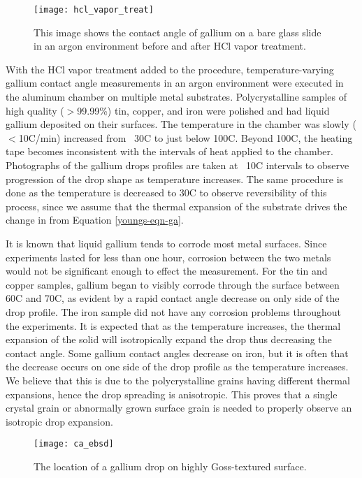 \begin{figure}[h]
	\centering
	\texttt{[image: hcl\_vapor\_treat]}
	\caption{This image shows the contact angle of gallium on a bare glass slide in an argon environment before and after HCl vapor treatment.}
	\label{fig:hcl_vapor_treat}
\end{figure}

With the HCl vapor treatment added to the procedure, temperature-varying gallium contact angle measurements in an argon environment were executed in the aluminum chamber on multiple metal substrates. Polycrystalline samples of high quality ($>$99.99\%) tin, copper, and iron were polished and had liquid gallium deposited on their surfaces. The temperature in the chamber was slowly ($<$10\degree C/min) increased from ~30\degree C to just below 100\degree C. Beyond 100\degree C, the heating tape becomes inconsistent with the intervals of heat applied to the chamber. Photographs of the gallium drops profiles are taken at ~10\degree C intervals to observe progression of the drop shape as temperature increases. The same procedure is done as the temperature is decreased to 30\degree C to observe reversibility of this process, since we assume that the thermal expansion of the substrate drives the change in \gamSL from Equation \ref{youngs-eqn-ga}. 

It is known that liquid gallium tends to corrode most metal surfaces.\cite{Lewandowski2015,Narh1998,Fitzgerald1999} Since experiments lasted for less than one hour, corrosion between the two metals would not be significant enough to effect the measurement. For the tin and copper samples, gallium began to visibly corrode through the surface between 60\degree C and 70\degree C, as evident by a rapid contact angle decrease on only side of the drop profile. The iron sample did not have any corrosion problems throughout the experiments. It is expected that as the temperature increases, the thermal expansion of the solid will isotropically expand the drop thus decreasing the contact angle. Some gallium contact angles decrease on iron, but it is often that the decrease occurs on one side of the drop profile as the temperature increases. We believe that this is due to the polycrystalline grains having different thermal expansions, hence the drop spreading is anisotropic. This proves that a single crystal grain or abnormally grown surface grain is needed to properly observe an isotropic drop expansion. 

\begin{figure}[h]
	\centering
	\texttt{[image: ca\_ebsd]}
	\caption{The location of a gallium drop on highly Goss-textured surface.}
	\label{fig:ca_ebsd}
\end{figure}

